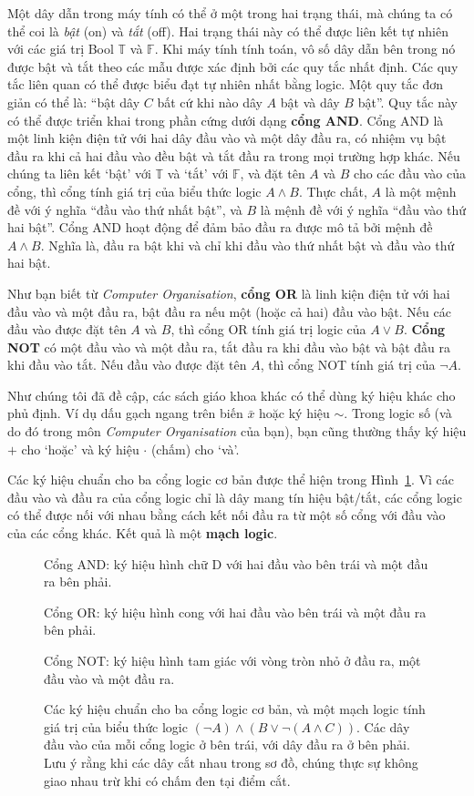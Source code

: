 Một dây dẫn trong máy tính có thể ở một trong hai trạng thái, mà chúng ta có thể coi là \emph{bật} (on) và \emph{tắt} (off). Hai trạng thái này có thể được liên kết tự nhiên với các giá trị Bool $\mathbb{T}$ và $\mathbb{F}$. Khi máy tính tính toán, vô số dây dẫn bên trong nó được bật và tắt theo các mẫu được xác định bởi các quy tắc nhất định. Các quy tắc liên quan có thể được biểu đạt tự nhiên nhất bằng logic. Một quy tắc đơn giản có thể là: ``bật dây $C$ bất cứ khi nào dây $A$ bật và dây $B$ bật''. Quy tắc này có thể được triển khai trong phần cứng dưới dạng \textbf{cổng AND}. Cổng AND là một linh kiện điện tử với hai dây đầu vào và một dây đầu ra, có nhiệm vụ bật đầu ra khi cả hai đầu vào đều bật và tắt đầu ra trong mọi trường hợp khác. Nếu chúng ta liên kết `bật' với $\mathbb{T}$ và `tắt' với $\mathbb{F}$, và đặt tên $A$ và $B$ cho các đầu vào của cổng, thì cổng tính giá trị của biểu thức logic $A \land B$. Thực chất, $A$ là một mệnh đề với ý nghĩa ``đầu vào thứ nhất bật'', và $B$ là mệnh đề với ý nghĩa ``đầu vào thứ hai bật''. Cổng AND hoạt động để đảm bảo đầu ra được mô tả bởi mệnh đề $A \land B$. Nghĩa là, đầu ra bật khi và chỉ khi đầu vào thứ nhất bật và đầu vào thứ hai bật.

Như bạn biết từ \emph{Computer Organisation}, \textbf{cổng OR} là linh kiện điện tử với hai đầu vào và một đầu ra, bật đầu ra nếu một (hoặc cả hai) đầu vào bật. Nếu các đầu vào được đặt tên $A$ và $B$, thì cổng OR tính giá trị logic của $A \lor B$. \textbf{Cổng NOT} có một đầu vào và một đầu ra, tắt đầu ra khi đầu vào bật và bật đầu ra khi đầu vào tắt. Nếu đầu vào được đặt tên $A$, thì cổng NOT tính giá trị của $\lnot A$.

\begin{warningbox}
Như chúng tôi đã đề cập, các sách giáo khoa khác có thể dùng ký hiệu khác cho phủ định. Ví dụ dấu gạch ngang trên biến $\bar{x}$ hoặc ký hiệu $\sim$. Trong logic số (và do đó trong môn \emph{Computer Organisation} của bạn), bạn cũng thường thấy ký hiệu $+$ cho `hoặc' và ký hiệu $\cdot$ (chấm) cho `và'.
\end{warningbox}

Các ký hiệu chuẩn cho ba cổng logic cơ bản được thể hiện trong Hình~\ref{fig:gates}. Vì các đầu vào và đầu ra của cổng logic chỉ là dây mang tín hiệu bật/tắt, các cổng logic có thể được nối với nhau bằng cách kết nối đầu ra từ một số cổng với đầu vào của các cổng khác. Kết quả là một \textbf{mạch logic}.

\begin{figure}[h]
\centering
Cổng AND: ký hiệu hình chữ D với hai đầu vào bên trái và một đầu ra bên phải.

Cổng OR: ký hiệu hình cong với hai đầu vào bên trái và một đầu ra bên phải.

Cổng NOT: ký hiệu hình tam giác với vòng tròn nhỏ ở đầu ra, một đầu vào và một đầu ra.
\caption{Các ký hiệu chuẩn cho ba cổng logic cơ bản, và một mạch logic tính giá trị của biểu thức logic $(\lnot A) \land (B \lor \lnot(A \land C))$. Các dây đầu vào của mỗi cổng logic ở bên trái, với dây đầu ra ở bên phải. Lưu ý rằng khi các dây cắt nhau trong sơ đồ, chúng thực sự không giao nhau trừ khi có chấm đen tại điểm cắt.}
\label{fig:gates}
\end{figure}


